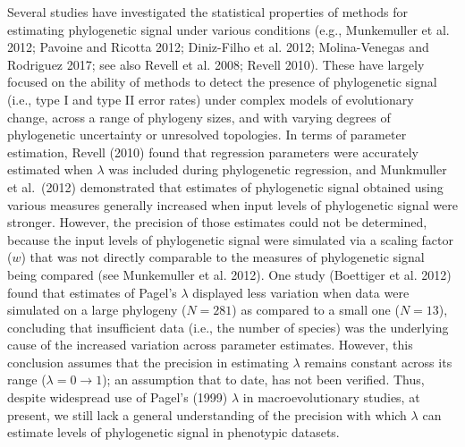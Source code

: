 \documentclass[
]{article}
\begin{document}
Several studies have investigated the statistical properties of methods
for estimating phylogenetic signal under various conditions (e.g.,
Munkemuller et al. 2012; Pavoine and Ricotta 2012; Diniz-Filho et al.
2012; Molina-Venegas and Rodriguez 2017; see also Revell et al. 2008;
Revell 2010). These have largely focused on the ability of methods to
detect the presence of phylogenetic signal (i.e., type I and type II
error rates) under complex models of evolutionary change, across a range
of phylogeny sizes, and with varying degrees of phylogenetic uncertainty
or unresolved topologies. In terms of parameter estimation, Revell
(2010) found that regression parameters were accurately estimated when
\(\lambda\) was included during phylogenetic regression, and Munkmuller
et al.~(2012) demonstrated that estimates of phylogenetic signal
obtained using various measures generally increased when input levels of
phylogenetic signal were stronger. However, the precision of those
estimates could not be determined, because the input levels of
phylogenetic signal were simulated via a scaling factor (\(w\)) that was
not directly comparable to the measures of phylogenetic signal being
compared (see Munkemuller et al. 2012). One study (Boettiger et al.
2012) found that estimates of Pagel's \(\lambda\) displayed less
variation when data were simulated on a large phylogeny (\(N=281\)) as
compared to a small one (\(N=13\)), concluding that insufficient data
(i.e., the number of species) was the underlying cause of the increased
variation across parameter estimates. However, this conclusion assumes
that the precision in estimating \(\lambda\) remains constant across its
range (\(\lambda = 0 \to 1\)); an assumption that to date, has not been
verified. Thus, despite widespread use of Pagel's (1999) \(\lambda\) in
macroevolutionary studies, at present, we still lack a general
understanding of the precision with which \(\lambda\) can estimate
levels of phylogenetic signal in phenotypic datasets. \hfill\break
\end{document}
